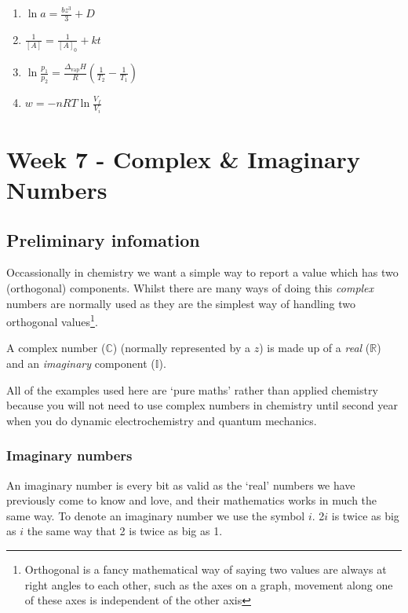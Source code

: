 \documentclass[
]{book}
\providecommand{\tightlist}{%
  \setlength{\itemsep}{0pt}\setlength{\parskip}{0pt}}
\begin{document}
\begin{enumerate}
\def\labelenumi{\arabic{enumi}.}
\tightlist
\item
  \(\ln a = \frac{bz^3}{3}+D\)
\item
  \(\frac{1}{[A]}=\frac{1}{[A]_0}+ kt\)
\item
  \(\ln \frac{p_1}{p_2}=\frac{\Delta_{\textrm{vap}}H}{R}\left({\frac{1}{T_2}-\frac{1}{T_1}}\right)\)
\item
  \(w = -nRT \ln \frac{V_f}{V_i}\)
\end{enumerate}

\hypertarget{ch:Workshop7}{%
\chapter{Week 7 - Complex \& Imaginary Numbers}\label{ch:Workshop7}}

\hypertarget{sec:Prelim7}{%
\section{Preliminary infomation}\label{sec:Prelim7}}

Occassionally in chemistry we want a simple way to report a value which has two (orthogonal) components. Whilst there are many ways of doing this \emph{complex} numbers are normally used as they are the simplest way of handling two orthogonal values\footnote{Orthogonal is a fancy mathematical way of saying two values are always at right angles to each other, such as the axes on a graph, movement along one of these axes is independent of the other axis}.

A complex number (\(\mathbb{C}\)) (normally represented by a \(z\)) is made up of a \emph{real} (\(\mathbb{R}\)) and an \emph{imaginary} component (\(\mathbb{I}\)).

All of the examples used here are `pure maths' rather than applied chemistry because you will not need to use complex numbers in chemistry until second year when you do dynamic electrochemistry and quantum mechanics.

\hypertarget{imaginary-numbers}{%
\subsection{Imaginary numbers}\label{imaginary-numbers}}

An imaginary number is every bit as valid as the `real' numbers we have previously come to know and love, and their mathematics works in much the same way. To denote an imaginary number we use the symbol \(i\). 2\(i\) is twice as big as \(i\) the same way that 2 is twice as big as 1.
\end{document}

